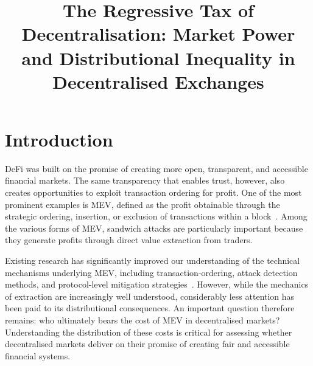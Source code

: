 \documentclass[pdflatex, sn-basic]{sn-jnl}
\theoremstyle{thmstylethree}%
\begin{document}
	\title[The Regressive Tax of Decentralisation]{The Regressive Tax of
	Decentralisation: Market Power and Distributional Inequality in Decentralised Exchanges}

	\author[1,2]{ }
	\author[3]{ }
	\author*[4,5]{ }
	\author*[6,7]{ }




	\maketitle

\section{Introduction}
\label{sec:introduction}

\Ac{DeFi} was built on the promise of creating more open, transparent, and accessible financial markets.
The same transparency that enables trust, however, also creates opportunities to exploit transaction ordering for profit.
One of the most prominent examples is \ac{MEV}, defined as the profit obtainable through the strategic ordering, insertion, or exclusion of transactions within a block~\citep{Daian2020}.
Among the various forms of \ac{MEV}, sandwich attacks are particularly important because they generate profits through direct value extraction from traders.

Existing research has significantly improved our understanding of the technical mechanisms underlying \ac{MEV}, including transaction-ordering, attack detection methods, and protocol-level mitigation strategies~\citep{Daian2020,Qin2022,Heimbach2022}.
However, while the mechanics of extraction are increasingly well understood, considerably less attention has been paid to its distributional consequences.
An important question therefore remains: who ultimately bears the cost of \ac{MEV} in decentralised markets?
Understanding the distribution of these costs is critical for assessing whether decentralised markets deliver on their promise of creating fair and accessible financial systems.
\end{document}
